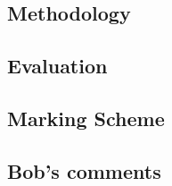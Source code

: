 \documentclass[a4paper]{report}
\begin{document}
\subsection{Methodology}
\subsection{Evaluation}
\subsection{Marking Scheme}
\subsection{Bob's comments}

% 
% 
\end{document}
